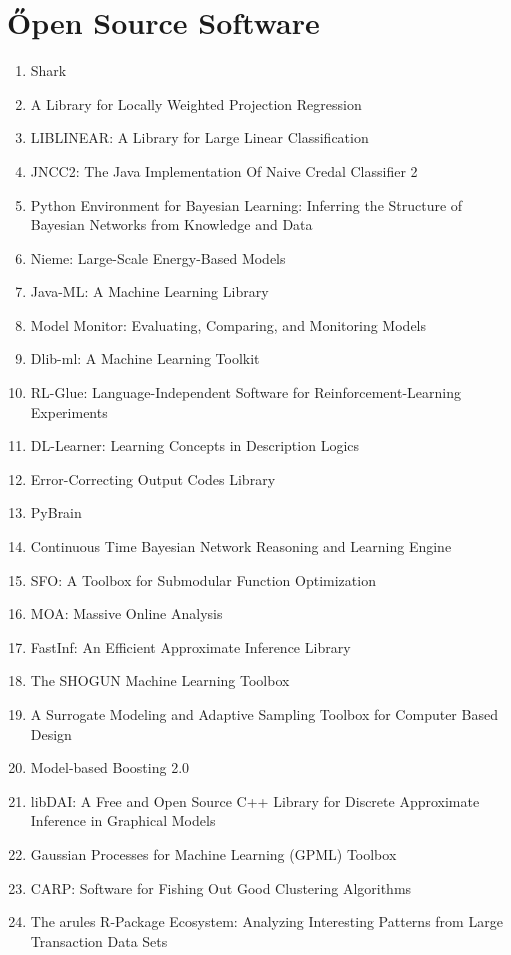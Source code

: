 \documentclass[a4paper,12pt,oneside]{book}
\begin{document}
\section{\H Open Source Software}
\begin{enumerate}
\item Shark
\item A Library for Locally Weighted Projection Regression
\item LIBLINEAR: A Library for Large Linear Classification
\item JNCC2: The Java Implementation Of Naive Credal Classifier 2
\item Python Environment for Bayesian Learning: Inferring the Structure of Bayesian Networks from Knowledge and Data
\item Nieme: Large-Scale Energy-Based Models
\item Java-ML: A Machine Learning Library
\item Model Monitor: Evaluating, Comparing, and Monitoring Models
\item Dlib-ml: A Machine Learning Toolkit
\item RL-Glue: Language-Independent Software for Reinforcement-Learning Experiments
\item DL-Learner: Learning Concepts in Description Logics
\item Error-Correcting Output Codes Library
\item PyBrain
\item Continuous Time Bayesian Network Reasoning and Learning Engine
\item SFO: A Toolbox for Submodular Function Optimization
\item MOA: Massive Online Analysis
\item FastInf: An Efficient Approximate Inference Library
\item The SHOGUN Machine Learning Toolbox
\item A Surrogate Modeling and Adaptive Sampling Toolbox for Computer Based Design
\item Model-based Boosting 2.0
\item libDAI: A Free and Open Source C++ Library for Discrete Approximate Inference in Graphical Models
\item Gaussian Processes for Machine Learning (GPML) Toolbox
\item CARP: Software for Fishing Out Good Clustering Algorithms
\item The arules R-Package Ecosystem: Analyzing Interesting Patterns from Large Transaction Data Sets

\end{enumerate}
\end{document}

